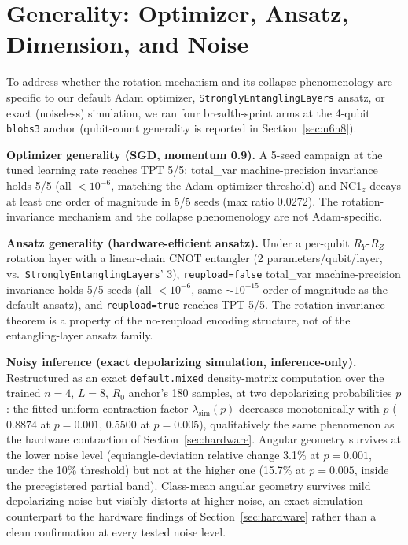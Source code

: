 \documentclass[pdflatex,sn-mathphys-ay]{sn-jnl}
\theoremstyle{thmstyleone}
\theoremstyle{thmstyletwo}
\begin{document}
\section{Generality: Optimizer, Ansatz, Dimension, and Noise}
\label{sec:generality}

To address whether the rotation mechanism and its collapse phenomenology are specific to our default Adam optimizer, \texttt{StronglyEntanglingLayers} ansatz, or exact (noiseless) simulation, we ran four breadth-sprint arms at the 4-qubit \texttt{blobs3} anchor (qubit-count generality is reported in Section~\ref{sec:n6n8}).

\textbf{Optimizer generality (SGD, momentum 0.9).} A 5-seed campaign at the tuned learning rate reaches TPT 5/5; total\_var machine-precision invariance holds 5/5 (all $<10^{-6}$, matching the Adam-optimizer threshold) and NC1$_z$ decays at least one order of magnitude in 5/5 seeds (max ratio 0.0272). The rotation-invariance mechanism and the collapse phenomenology are not Adam-specific.

\textbf{Ansatz generality (hardware-efficient ansatz).} Under a per-qubit $R_Y$-$R_Z$ rotation layer with a linear-chain CNOT entangler (2 parameters/qubit/layer, vs.\ \texttt{StronglyEntanglingLayers}' 3), \texttt{reupload=false} total\_var machine-precision invariance holds 5/5 seeds (all $<10^{-6}$, same $\sim10^{-15}$ order of magnitude as the default ansatz), and \texttt{reupload=true} reaches TPT 5/5. The rotation-invariance theorem is a property of the no-reupload encoding structure, not of the entangling-layer ansatz family.

\textbf{Noisy inference (exact depolarizing simulation, inference-only).} Restructured as an exact \texttt{default.mixed} density-matrix computation over the trained $n=4$, $L{=}8$, $R_0$ anchor's 180 samples, at two depolarizing probabilities $p$: the fitted uniform-contraction factor $\lambda_\mathrm{sim}(p)$ decreases monotonically with $p$ ($0.8874$ at $p{=}0.001$, $0.5500$ at $p{=}0.005$), qualitatively the same phenomenon as the hardware contraction of Section~\ref{sec:hardware}. Angular geometry survives at the lower noise level (equiangle-deviation relative change 3.1\% at $p{=}0.001$, under the 10\% threshold) but not at the higher one (15.7\% at $p{=}0.005$, inside the preregistered partial band). Class-mean angular geometry survives mild depolarizing noise but visibly distorts at higher noise, an exact-simulation counterpart to the hardware findings of Section~\ref{sec:hardware} rather than a clean confirmation at every tested noise level.
\end{document}
